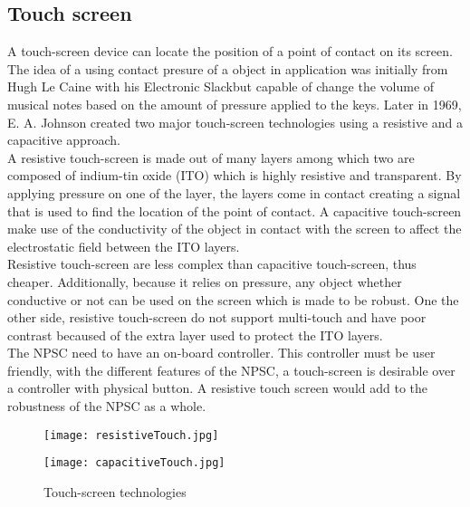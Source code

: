 \subsection{Touch screen}
A touch-screen device can locate the position of a point of contact on its screen. The idea of a using  contact presure of a object in application was initially from Hugh Le Caine with his Electronic Slackbut capable of change the volume of musical notes based on the amount of pressure applied to the keys. Later in 1969, E. A. Johnson created two major touch-screen technologies using a resistive and a capacitive approach. \\
A resistive touch-screen is made out of many layers among which two are composed of indium-tin oxide (ITO) which is highly resistive and transparent. By applying pressure on one of the layer, the layers come in contact creating a signal that is used to find the location of the point of contact. A capacitive touch-screen make use of the conductivity of the object in contact with the screen to affect the electrostatic field between the ITO layers. \\
Resistive touch-screen are less complex than capacitive touch-screen, thus cheaper. Additionally, because it relies on pressure, any object whether conductive or not can be used on the screen which is made to be robust. One the other side, resistive touch-screen do not support multi-touch and have poor contrast becaused of the extra layer used to protect the ITO layers.\\
The NPSC need to have an on-board controller. This controller must be user friendly, with the different features of the NPSC, a touch-screen is desirable over a controller with physical button. A resistive touch screen would add to the robustness of the NPSC as a whole.   
\begin{figure}[h!]
\centering
\begin{minipage}[b]{0.45\textwidth}
\texttt{[image: resistiveTouch.jpg]}
\label{fig:philips1}
\end{minipage}
\begin{minipage}[b]{0.45\textwidth}
\texttt{[image: capacitiveTouch.jpg]}
\label{fig:philips2}
\end{minipage}
\caption{Touch-screen technologies}
\label{philips}
\end{figure}    

